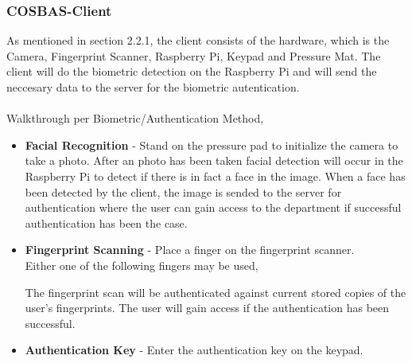 \subsubsection{COSBAS-Client}
As mentioned in section 2.2.1, the client consists of the hardware, which is the Camera, Fingerprint Scanner, Raspberry Pi, Keypad and Pressure Mat. The client will do the biometric detection on the Raspberry Pi and will send the neccesary data to the server for the biometric autentication.\\
\\
Walkthrough per Biometric/Authentication Method,
\begin{itemize}
		\item{\textbf{Facial Recognition } - Stand on the pressure pad to initialize the camera to take a photo. After an photo has been taken facial detection will occur in the Raspberry Pi to detect if there is in fact a face in the image. When a face has been detected by the client, the image is sended to the server for authentication where the user can gain access to the department if successful authentication has been the case.} 
		\item{\textbf{Fingerprint Scanning} - Place a finger on the fingerprint scanner. \\
			Either one of the following fingers may be used, 

			The fingerprint scan will be authenticated against current stored copies of the user's fingerprints. The user will gain access if the authentication has been successful.
			}

	\item{\textbf{Authentication Key} - Enter the authentication key on the keypad. 


		}
	\end{itemize}

